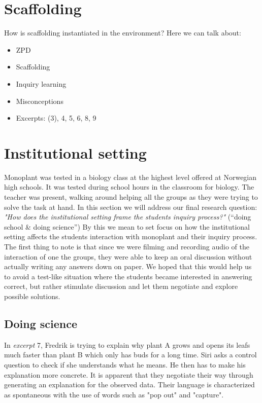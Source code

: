 \section{Scaffolding}
How is scaffolding instantiated in the environment?
Here we can talk about: 
\begin{itemize}
\item{ZPD}
\item{Scaffolding}
\item{Inquiry learning}
\item{Misconceptions}
\item{Excerpts: (3), 4, 5, 6, 8, 9}
\end{itemize}

\section{Institutional setting}
Monoplant was tested in a biology class at the highest level offered at Norwegian high schools. It was tested during school hours in the classroom for biology. The teacher was present, walking around helping all the groups as they were trying to solve the task at hand. In this section we will address our final research question: \emph{"How does the institutional setting frame the students inquiry process?"} (“doing school \& doing science”)
By this we mean to set focus on how the institutional setting affects the students interaction with monoplant and their inquiry process. The first thing to note is that since we were filming and recording audio of the interaction of one the groups, they were able to keep an oral discussion without actually writing any answers down on paper. We hoped that this would help us to avoid a test-like situation where the students became interested in answering correct, but rather stimulate discussion and let them negotiate and explore possible solutions.



\subsection{Doing science}
In \emph{excerpt} 7, Fredrik is trying to explain why plant A grows and opens its leafs much faster than plant B which only has buds for a long time. Siri asks a control question to check if she understands what he means. He then has to make his explanation more concrete. It is apparent that they negotiate their way through generating an explanation for the observed data. Their language is characterized as spontaneous with the use of words such as "pop out" and "capture".

